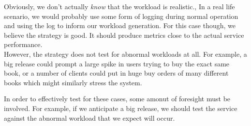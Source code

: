 \documentclass[11pt]{article}
\begin{document}
\begin{enumerate}
      Obviously, we don't actually \textit{know} that the workload is
      realistic., In a real life scenario, we would probably use some form of
      logging during normal operation and using the log to inform our workload
      generation. For this case though, we believe the strategy is good. It
      should produce metrics close to the actual service performance.\\

      However, the strategy does not test for abnormal workloads at all. For example,
      a big release could prompt a large spike in users trying to buy the exact same
      book, or a number of clients could put in huge buy orders of many different
      books which might similarly stress the system.

      In order to effectively test for these cases, some amonut of foresight must be
      involved. For example, if we anticipate a big release, we should test the
      service against the abnormal workload that we expect will occur.
  \end{enumerate}
\end{document}
